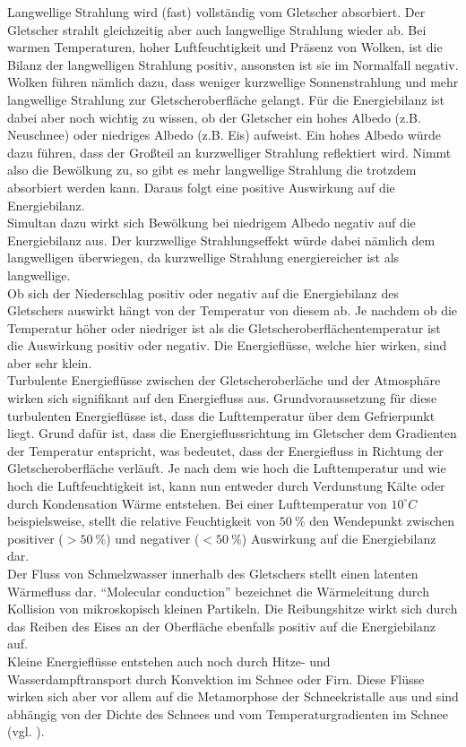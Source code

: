 \documentclass[12pt,a4paper]{article}
\begin{document}
Langwellige Strahlung wird (fast) vollständig vom Gletscher absorbiert. Der Gletscher strahlt gleichzeitig aber auch langwellige Strahlung wieder ab. Bei warmen Temperaturen, hoher Luftfeuchtigkeit und Präsenz von Wolken, ist die Bilanz der langwelligen Strahlung positiv, ansonsten ist sie im Normalfall negativ.\\
Wolken führen nämlich dazu, dass weniger kurzwellige Sonnenstrahlung und mehr langwellige Strahlung zur Gletscheroberfläche gelangt. Für die Energiebilanz ist dabei aber noch wichtig zu wissen, ob der Gletscher ein hohes Albedo (z.B. Neuschnee) oder niedriges Albedo (z.B. Eis) aufweist. Ein hohes Albedo würde dazu führen, dass der Großteil an kurzwelliger Strahlung reflektiert wird. Nimmt also die Bewölkung zu, so gibt es mehr langwellige Strahlung die trotzdem absorbiert werden kann. Daraus folgt eine positive Auswirkung auf die Energiebilanz.\\
Simultan dazu wirkt sich Bewölkung bei niedrigem Albedo negativ auf die Energiebilanz aus. Der kurzwellige Strahlungseffekt würde dabei nämlich dem langwelligen überwiegen, da kurzwellige Strahlung energiereicher ist als langwellige.\\

Ob sich der Niederschlag positiv oder negativ auf die Energiebilanz des Gletschers auswirkt hängt von der Temperatur von diesem ab. Je nachdem ob die Temperatur höher oder niedriger ist als die Gletscheroberflächentemperatur ist die Auswirkung positiv oder negativ. Die Energieflüsse, welche hier wirken, sind aber sehr klein.\\

Turbulente Energieflüsse zwischen der Gletscheroberläche und der Atmosphäre wirken sich signifikant auf den Energiefluss aus. Grundvoraussetzung für diese turbulenten Energieflüsse ist, dass die Lufttemperatur über dem Gefrierpunkt liegt. Grund dafür ist, dass die Energieflussrichtung im Gletscher dem Gradienten der Temperatur entspricht, was bedeutet, dass der Energiefluss in Richtung der Gletscheroberfläche verläuft. Je nach dem wie hoch die Lufttemperatur und wie hoch die Luftfeuchtigkeit ist, kann nun entweder durch Verdunstung Kälte oder durch Kondensation Wärme entstehen. Bei einer Lufttemperatur von $10^\circ C$ beispielsweise, stellt die relative Feuchtigkeit von $50~\%$ den Wendepunkt zwischen positiver ($>50~\%$) und negativer ($<50~\%$) Auswirkung auf die Energiebilanz dar.\\

Der Fluss von Schmelzwasser innerhalb des Gletschers stellt einen latenten Wärmefluss dar. 
``Molecular conduction'' bezeichnet die Wärmeleitung durch Kollision von mikroskopisch kleinen Partikeln. Die Reibungshitze wirkt sich durch das Reiben des Eises an der Oberfläche ebenfalls positiv auf die Energiebilanz auf.\\
Kleine Energieflüsse entstehen auch noch durch Hitze- und Wasserdampftransport durch Konvektion im Schnee oder Firn. Diese Flüsse wirken sich aber vor allem auf die Metamorphose der Schneekristalle aus und sind abhängig von der Dichte des Schnees und vom Temperaturgradienten im Schnee (vgl. \cite[16, 17]{Themicroclimateofvalleyglaciers}).
\end{document}
